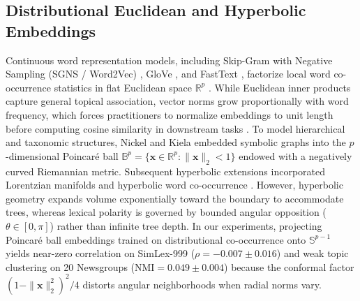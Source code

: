 \documentclass[journal]{IEEEtran}
\begin{document}
\subsection{Distributional Euclidean and Hyperbolic Embeddings}
Continuous word representation models, including Skip-Gram with Negative Sampling (SGNS / Word2Vec) \cite{mikolov2013distributed}, GloVe \cite{pennington2014glove}, and FastText \cite{bojanowski2017enriching}, factorize local word co-occurrence statistics in flat Euclidean space $\mathbb{R}^p$ \cite{levy2014neural}. While Euclidean inner products capture general topical association, vector norms grow proportionally with word frequency, which forces practitioners to normalize embeddings to unit length before computing cosine similarity in downstream tasks \cite{xing2015normalized,meng2019spherical}. To model hierarchical and taxonomic structures, Nickel and Kiela \cite{nickel2017poincare} embedded symbolic graphs into the $p$-dimensional Poincar\'{e} ball $\mathbb{B}^p = \{\mathbf{x} \in \mathbb{R}^p : \|\mathbf{x}\|_2 < 1\}$ endowed with a negatively curved Riemannian metric. Subsequent hyperbolic extensions incorporated Lorentzian manifolds \cite{nickel2018learning} and hyperbolic word co-occurrence \cite{tifrea2018poincare}. However, hyperbolic geometry expands volume exponentially toward the boundary to accommodate trees, whereas lexical polarity is governed by bounded angular opposition ($\theta \in [0, \pi]$) rather than infinite tree depth. In our experiments, projecting Poincar\'{e} ball embeddings trained on distributional co-occurrence onto $\mathbb{S}^{p-1}$ yields near-zero correlation on SimLex-999 ($\rho = -0.007 \pm 0.016$) and weak topic clustering on 20 Newsgroups ($\text{NMI} = 0.049 \pm 0.004$) because the conformal factor $(1 - \|\mathbf{x}\|_2^2)^2 / 4$ distorts angular neighborhoods when radial norms vary.
\end{document}
